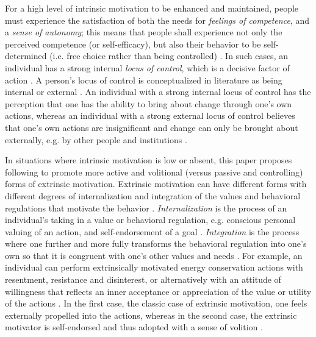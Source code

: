 \documentclass[a4paper]{article}
\begin{document}
For a high level of intrinsic motivation to be enhanced and maintained, people must experience the satisfaction of both the needs for \textit{feelings of competence}, and a  \textit{sense of autonomy}; this means that people shall experience not only the perceived 
competence (or self-efficacy), but also their behavior to be self-determined (i.e. free choice rather than being controlled) \citep{Ryan2000}. In such cases, an individual has a strong internal \textit{locus of control}, which is a decisive factor of action \citep{Kollmuss2002}. A person's locus of control is conceptualized in literature as being internal or external \citep{Rotter1966}. An individual with a strong internal locus of control has the perception that one has the ability to bring about change through one's own actions, whereas an individual with a strong external locus of control believes that one's own actions are insignificant and change can only be brought about externally, e.g. by other people and institutions \citep{Rotter1966}. 

In situations where intrinsic motivation is low or absent, this paper proposes following \citet{Ryan2000} to promote more active and volitional (versus passive and controlling) forms of extrinsic motivation. Extrinsic motivation can have different forms with different degrees of internalization and integration of the values and behavioral regulations that motivate the behavior \citep{Ryan2000}. \textit{Internalization} is the process of an individual's taking in a value or behavioral regulation, e.g. conscious personal valuing of an action, and self-endorsement of a goal \citep{Ryan2000}. \textit{Integration} is the process where one further and more fully transforms the behavioral regulation into one's own so that it is congruent with one's other values and needs \citep{Ryan2000}. For example, an individual can perform extrinsically motivated energy conservation actions with resentment, resistance and disinterest, or alternatively with an attitude of willingness that reflects an inner acceptance or appreciation of the value or utility of the actions \citep{Ryan2000}. In the first case, the classic case of extrinsic motivation, one feels externally propelled into the actions, whereas in the second case, the extrinsic motivator is self-endorsed and thus adopted with a sense of volition \citep{Ryan2000}. 
\end{document}
